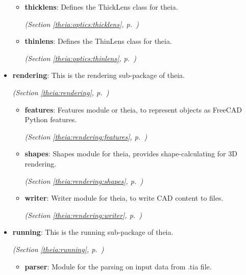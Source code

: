 \begin{itemize}
\begin{itemize}
    \item \textbf{thicklens}: Defines the ThickLens class for theia.



  \textit{(Section \ref{theia:optics:thicklens}, p.~\pageref{theia:optics:thicklens})}

    \item \textbf{thinlens}: Defines the ThinLens class for theia.



  \textit{(Section \ref{theia:optics:thinlens}, p.~\pageref{theia:optics:thinlens})}

  \end{itemize}
\item \textbf{rendering}: This is the rendering sub-package of theia.



  \textit{(Section \ref{theia:rendering}, p.~\pageref{theia:rendering})}

  \begin{itemize}
\setlength{\parskip}{0ex}
    \item \textbf{features}: Features module or theia, to represent objects as FreeCAD Python features.



  \textit{(Section \ref{theia:rendering:features}, p.~\pageref{theia:rendering:features})}

    \item \textbf{shapes}: Shapes module for theia, provides shape-calculating for 3D rendering.



  \textit{(Section \ref{theia:rendering:shapes}, p.~\pageref{theia:rendering:shapes})}

    \item \textbf{writer}: Writer module for theia, to write CAD content to files.



  \textit{(Section \ref{theia:rendering:writer}, p.~\pageref{theia:rendering:writer})}

  \end{itemize}
\item \textbf{running}: This is the running sub-package of theia.



  \textit{(Section \ref{theia:running}, p.~\pageref{theia:running})}

  \begin{itemize}
\setlength{\parskip}{0ex}
    \item \textbf{parser}: Module for the parsing on input data from .tia file.




\end{itemize}
\end{itemize}
